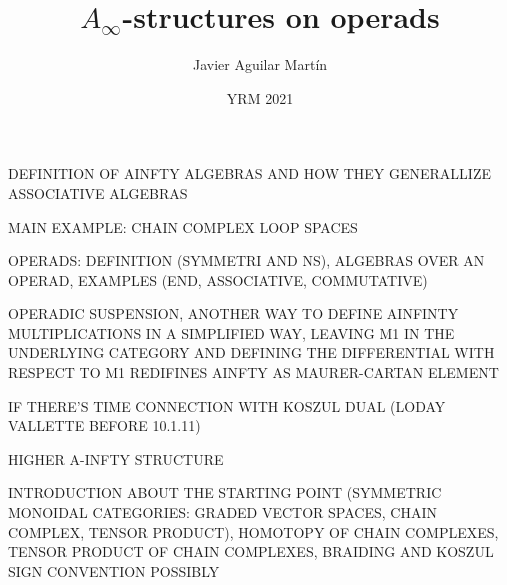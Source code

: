 \documentclass{beamer}
\title{$A_\infty$-structures on operads}
\author{Javier Aguilar Mart\'in}
\institute{University of Kent}
\date{YRM 2021}
\theoremstyle{definition}
\begin{document}
\frame{\titlepage}
%
% 
% 
% 

% 



\newcommand{\seti}{\setcounter{saveenumi}{\value{enumi}}}
\newcommand{\conti}{\setcounter{enumi}{\value{saveenumi}}}

\makeatletter
\newcommand{\xRightarrow}[2][]{\ext@arrow 0359\Rightarrowfill@{#1}{#2}}
\makeatother





\begin{frame}
DEFINITION OF AINFTY ALGEBRAS AND HOW THEY GENERALLIZE ASSOCIATIVE ALGEBRAS

MAIN EXAMPLE: CHAIN COMPLEX LOOP SPACES

OPERADS: DEFINITION (SYMMETRI AND  NS), ALGEBRAS OVER AN OPERAD, EXAMPLES (END, ASSOCIATIVE, COMMUTATIVE)

OPERADIC SUSPENSION, ANOTHER WAY TO DEFINE AINFINTY MULTIPLICATIONS IN A SIMPLIFIED WAY, LEAVING M1 IN THE UNDERLYING CATEGORY AND DEFINING THE DIFFERENTIAL WITH RESPECT TO M1 REDIFINES AINFTY AS MAURER-CARTAN ELEMENT

IF THERE'S TIME CONNECTION WITH KOSZUL DUAL (LODAY VALLETTE BEFORE 10.1.11)

HIGHER A-INFTY STRUCTURE
\end{frame}
\begin{frame}
INTRODUCTION ABOUT THE STARTING POINT (SYMMETRIC MONOIDAL CATEGORIES: GRADED VECTOR SPACES, CHAIN COMPLEX, TENSOR PRODUCT), HOMOTOPY OF CHAIN COMPLEXES, TENSOR PRODUCT OF CHAIN COMPLEXES, BRAIDING AND KOSZUL SIGN CONVENTION POSSIBLY
\end{frame}
\end{document}
